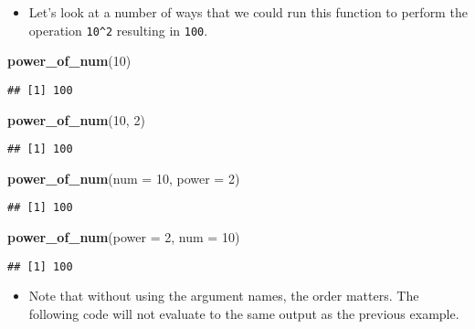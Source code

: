 \documentclass[]{book}
\newenvironment{Shaded}{\begin{snugshade}}{\end{snugshade}}
\newcommand{\KeywordTok}[1]{\textcolor[rgb]{0.13,0.29,0.53}{\textbf{#1}}}
\newcommand{\DataTypeTok}[1]{\textcolor[rgb]{0.13,0.29,0.53}{#1}}
\newcommand{\DecValTok}[1]{\textcolor[rgb]{0.00,0.00,0.81}{#1}}
\newcommand{\NormalTok}[1]{#1}
\providecommand{\tightlist}{%
  \setlength{\itemsep}{0pt}\setlength{\parskip}{0pt}}
\begin{document}
\begin{itemize}
\tightlist
\item
  Let's look at a number of ways that we could run this function to
  perform the operation \texttt{10\^{}2} resulting in \texttt{100}.
\end{itemize}

\begin{Shaded}
\begin{Highlighting}[]
\KeywordTok{power_of_num}\NormalTok{(}\DecValTok{10}\NormalTok{)}
\end{Highlighting}
\end{Shaded}

\begin{verbatim}
## [1] 100
\end{verbatim}

\begin{Shaded}
\begin{Highlighting}[]
\KeywordTok{power_of_num}\NormalTok{(}\DecValTok{10}\NormalTok{, }\DecValTok{2}\NormalTok{)}
\end{Highlighting}
\end{Shaded}

\begin{verbatim}
## [1] 100
\end{verbatim}

\begin{Shaded}
\begin{Highlighting}[]
\KeywordTok{power_of_num}\NormalTok{(}\DataTypeTok{num =} \DecValTok{10}\NormalTok{, }\DataTypeTok{power =} \DecValTok{2}\NormalTok{)}
\end{Highlighting}
\end{Shaded}

\begin{verbatim}
## [1] 100
\end{verbatim}

\begin{Shaded}
\begin{Highlighting}[]
\KeywordTok{power_of_num}\NormalTok{(}\DataTypeTok{power =} \DecValTok{2}\NormalTok{, }\DataTypeTok{num =} \DecValTok{10}\NormalTok{)}
\end{Highlighting}
\end{Shaded}

\begin{verbatim}
## [1] 100
\end{verbatim}

\begin{itemize}
\tightlist
\item
  Note that without using the argument names, the order matters. The
  following code will not evaluate to the same output as the previous
  example.
\end{itemize}
\end{document}
